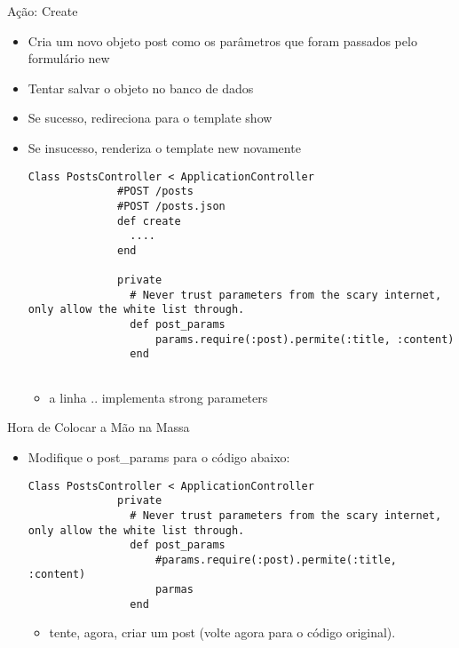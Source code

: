 \begin{frame}{Ação: Create}
	\begin{itemize}
		\item Cria um novo objeto \alert{post} como os parâmetros que foram passados pelo 
			formulário \alert{new}
		\item Tentar \alert{salvar} o objeto no \alert{banco de dados}
		\item Se sucesso, redireciona para o template \alert{show}
		\item Se insucesso, renderiza o template \alert{new} novamente
		\begin{lstlisting}[style=RubyInputStyle, caption=posts_controller.rb]
			Class PostsController < ApplicationController
			  #POST /posts
			  #POST /posts.json 
			  def create
			    ....
			  end 
				
			  private 
			    # Never trust parameters from the scary internet, only allow the white list through.
			    def post_params 
			    	params.require(:post).permite(:title, :content)
			    end 
				
		\end{lstlisting}		
		\begin{itemize}
			\item a linha .. implementa \alert{strong parameters}
		\end{itemize}
				
	\end{itemize}	
\end{frame}

\begin{frame}[t, fragile]{Hora de Colocar a Mão na Massa}
	\begin{itemize}
		\item Modifique o post_params para o código abaixo:
		\begin{lstlisting}[style=RubyInputStyle, caption=posts_controller.rb]
			Class PostsController < ApplicationController
			  private 
			    # Never trust parameters from the scary internet, only allow the white list through.
			    def post_params 
			    	#params.require(:post).permite(:title, :content)
			    	parmas
			    end 
		\end{lstlisting}		
		\begin{itemize}
			\item tente, agora, criar um post (volte agora para o código original).
		\end{itemize}
				
	\end{itemize}	
\end{frame}


